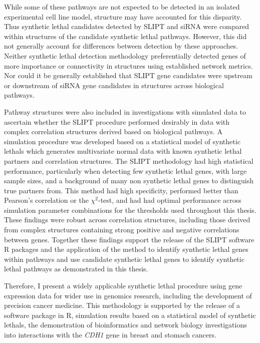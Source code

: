 While some of these pathways are not expected to be detected in an isolated experimental cell line model,  structure may have accounted for this disparity. Thus \gls{synthetic lethal} candidates detected by \gls{SLIPT} and \gls{siRNA} were compared within  structures of the candidate \gls{synthetic lethal} pathways. However, this did not generally account for differences between detection by these approaches. Neither \gls{synthetic lethal} detection methodology preferentially detected genes of more importance or connectivity in  structures using established network metrics. Nor could it be generally established that \gls{SLIPT} gene candidates were upstream or downstream of \gls{siRNA} gene candidates in  structures across biological pathways.

Pathway  structures were also included in investigations with simulated data to ascertain whether the \gls{SLIPT} procedure performed desirably in data with complex correlation structures derived based on biological pathways. A simulation procedure was developed based on a statistical model of \glspl{synthetic lethal} which generates multivariate normal data with known \gls{synthetic lethal} partners and correlation structures. The \gls{SLIPT} methodology had high statistical performance, particularly when detecting few \gls{synthetic lethal} genes, with large sample sizes, and a background of many non \gls{synthetic lethal} genes to distinguish true partners from. This method had high specificity, performed better than Pearson's correlation or the $\chi^2$-test, and had had optimal performance across simulation parameter combinations for the thresholds used throughout this thesis. These findings were robust across correlation structures, including those derived from complex  structures containing strong positive and negative correlations between genes. 
Together these findings support the release of the \gls{SLIPT} software R packages and the application of the method to identify \gls{synthetic lethal} genes within pathways and use candidate \gls{synthetic lethal} genes to identify \gls{synthetic lethal} pathways as demonstrated in this thesis.

Therefore, I present a widely applicable \gls{synthetic lethal} procedure using \gls{gene expression} data for wider use in \glspl{genomic} research, including the development of precision cancer medicine. This methodology is supported by the release of a software package in R, simulation results based on a statistical model of \glspl{synthetic lethal}, the demonstration of \gls{bioinformatics} and network biology investigations into interactions with the \textit{CDH1} gene in breast and stomach cancers. 


